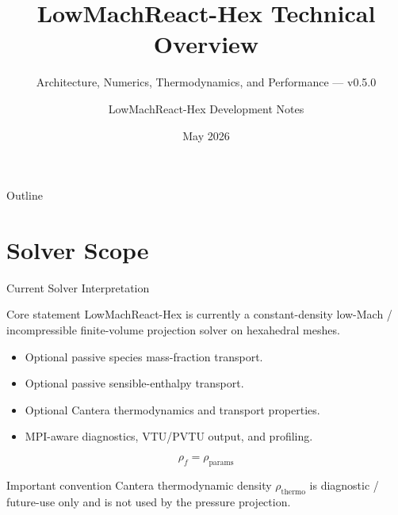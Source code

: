 \documentclass[aspectratio=169,11pt]{beamer}
\title[LowMachReact-Hex]{\textbf{LowMachReact-Hex} Technical Overview}
\subtitle{Architecture, Numerics, Thermodynamics, and Performance --- v0.5.0}
\author{LowMachReact-Hex Development Notes}
\date{May 2026}
\begin{document}
\begin{frame}
  \titlepage
\end{frame}

\begin{frame}{Outline}
  \tableofcontents
\end{frame}

\section{Solver Scope}

\begin{frame}{Current Solver Interpretation}
  \begin{block}{Core statement}
    LowMachReact-Hex is currently a constant-density low-Mach /
    incompressible finite-volume projection solver on hexahedral meshes.
  \end{block}

  \begin{itemize}
    \item Optional passive species mass-fraction transport.
    \item Optional passive sensible-enthalpy transport.
    \item Optional Cantera thermodynamics and transport properties.
    \item MPI-aware diagnostics, VTU/PVTU output, and profiling.
  \end{itemize}

  \vspace{0.5em}
  \[
    \rho_f = \rho_{\mathrm{params}}
  \]

  \begin{alertblock}{Important convention}
    Cantera thermodynamic density \(\rho_{\mathrm{thermo}}\) is diagnostic /
    future-use only and is not used by the pressure projection.
  \end{alertblock}
\end{frame}
\end{document}

